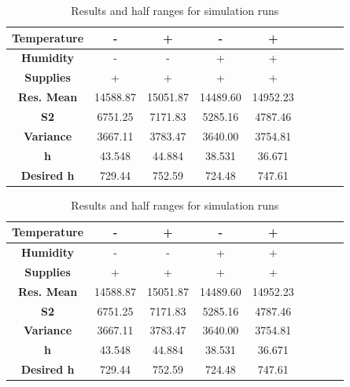 \documentclass[conference]{IEEEtran}
\begin{document}
\begin{enumerate}
    \begin{table}[]
    \caption{Results and half ranges for simulation runs}
    \begin{center}
    \begin{tabular}{|c|c|c|c|c|c|c|c|c|}
    \hline
    \textbf{Temperature} & - & + & - & + \\
    \hline
    \textbf{Humidity} & - & - & + & + \\
    \hline
    \textbf{Supplies} &+&+&+&+ \\
    \hline
    \textbf{Res. Mean} & 14588.87&15051.87&14489.60&14952.23 \\
    \hline
    \textbf{S2}& 6751.25&7171.83&5285.16&4787.46 \\
    \hline
    \textbf{Variance}&3667.11&3783.47&3640.00&3754.81\\
    \hline
    \textbf{h} &43.548&44.884&38.531&36.671\\
    \hline
    \textbf{Desired h}&729.44&752.59&724.48&747.61\\
    \hline
    \end{tabular}
    \label{tab:rep_significance}
    \end{center}
    \end{table}

    \begin{table}[]
    \caption{Results and half ranges for simulation runs}
    \begin{center}
    \begin{tabular}{|c|c|c|c|c|c|c|c|c|}
    \hline
    \textbf{Temperature} & - & + & - & + \\
    \hline
    \textbf{Humidity} & - & - & + & + \\
    \hline
    \textbf{Supplies} &+&+&+&+ \\
    \hline
    \textbf{Res. Mean} & 14588.87&15051.87&14489.60&14952.23 \\
    \hline
    \textbf{S2}& 6751.25&7171.83&5285.16&4787.46 \\
    \hline
    \textbf{Variance}&3667.11&3783.47&3640.00&3754.81\\
    \hline
    \textbf{h}&43.548&44.884&38.531&36.671\\
    \hline
    \textbf{Desired h}&729.44&752.59&724.48&747.61\\
    \hline
    \end{tabular}
    \label{tab:rep_significance_2}
    \end{center}
    \end{table}


\end{enumerate}
\end{document}
